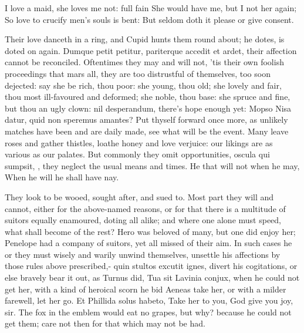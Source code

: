 {I love a maid, she loves me not: full fain
She would have me, but I not her again;
So love to crucify men's souls is bent:
But seldom doth it please or give consent.

Their love danceth in a ring, and Cupid hunts them round about; he
dotes, is doted on again. Dumque petit petitur, pariterque accedit et
ardet, their affection cannot be reconciled. Oftentimes they may and
will not, 'tis their own foolish proceedings that mars all, they are
too distrustful of themselves, too soon dejected: say she be rich, thou
poor: she young, thou old; she lovely and fair, thou most ill-favoured
and deformed; she noble, thou base: she spruce and fine, but thou an
ugly clown: nil desperandum, there's hope enough yet: Mopso Nisa datur,
quid non speremus amantes? Put thyself forward once more, as unlikely
matches have been and are daily made, see what will be the event. Many
leave roses and gather thistles, loathe honey and love verjuice: our
likings are as various as our palates. But commonly they omit
opportunities, oscula qui sumpsit, \etc{}, they neglect the usual means
and times.
He that will not when he may,
When he will he shall have nay.

They look to be wooed, sought after, and sued to. Most part they will
and cannot, either for the above-named reasons, or for that there is a
multitude of suitors equally enamoured, doting all alike; and where one
alone must speed, what shall become of the rest? Hero was beloved of
many, but one did enjoy her; Penelope had a company of suitors, yet all
missed of their aim. In such cases he or they must wisely and warily
unwind themselves, unsettle his affections by those rules above
prescribed,- quin stultos excutit ignes, divert his cogitations,
or else bravely bear it out, as Turnus did, Tua sit Lavinia conjux,
when he could not get her, with a kind of heroical scorn he bid Aeneas
take her, or with a milder farewell, let her go. Et Phillida solus
habeto, Take her to you, God give you joy, sir. The fox in the emblem
would eat no grapes, but why? because he could not get them; care not
then for that which may not be had.

}
